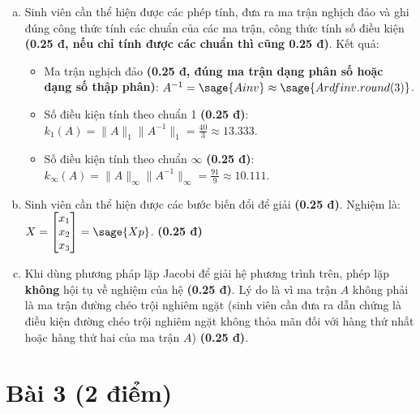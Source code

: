 \documentclass[12pt]{article}
\begin{document}
\begin{enumerate}[a)]
 \item Sinh viên cần thể hiện được các phép tính, đưa ra ma trận nghịch đảo và ghi đúng công thức tính các chuẩn của các ma trận, công thức tính số điều kiện \textbf{(0.25 đ, nếu chỉ tính được các chuẩn thì cũng 0.25 đ)}. Kết quả: 
 \begin{itemize}
  \item Ma trận nghịch đảo \textbf{(0.25 đ, đúng ma trận dạng phân số hoặc dạng số thập phân)}: $A^{-1} = \sage{Ainv} \approx \sage{Ardfinv.round(3)}$.
  \item Số điều kiện tính theo chuẩn 1 \textbf{(0.25 đ)}:  $k_1(A)=\|A\|_1 \|A^{-1}\|_1=\frac{40}{3}\approx 13.333$.
  \item Số điều kiện tính theo chuẩn $\infty$ \textbf{(0.25 đ)}:  $k_{\infty}(A)=\|A\|_{\infty} \|A^{-1}\|_{\infty}=\frac{91}{9}\approx 10.111$.
 \end{itemize}
 \item Sinh viên cần thể hiện được các bước biến đổi để giải \textbf{(0.25 đ)}. Nghiệm là: $X=\begin{bmatrix}x_1\\x_2\\x_3\end{bmatrix}=\sage{Xp}$. \textbf{(0.25 đ)}
 \item Khi dùng phương pháp lặp Jacobi để giải hệ phương trình trên, phép lặp \textbf{không} hội tụ về nghiệm của hệ \textbf{(0.25 đ)}. Lý do là vì ma trận $A$ không phải là ma trận đường chéo trội nghiêm ngặt (sinh viên cần đưa ra dẫn chứng là điều kiện đường chéo trội nghiêm ngặt không thỏa mãn đối với hàng thứ nhất hoặc hàng thứ hai của ma trận $A$) \textbf{(0.25 đ)}.
\end{enumerate}


\section{Bài 3 (2 điểm)}

\end{document}

